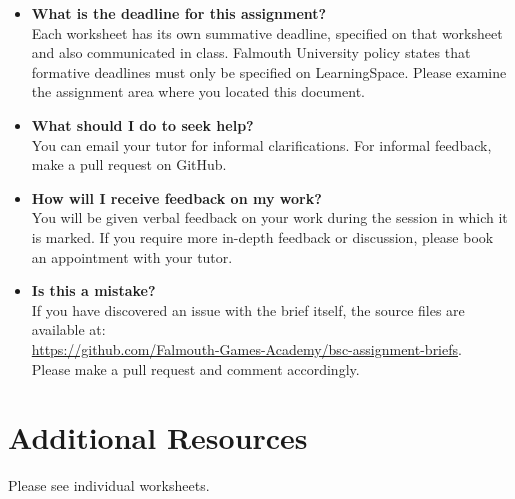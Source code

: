 \documentclass{../fal_assignment}
\begin{document}
\begin{itemize}
	\item 	\textbf{What is the deadline for this assignment?} \\ 
			Each worksheet has its own summative deadline, specified on that worksheet and also communicated in class.
    		Falmouth University policy states that formative deadlines must only be specified on LearningSpace. Please examine the assignment area where you located this document.
    		
	\item 	\textbf{What should I do to seek help?} \\ 
    		You can email your tutor for informal clarifications. For informal feedback, make a pull request on GitHub. 
    		
	\item 	\textbf{How will I receive feedback on my work?} \\ 
    		You will be given verbal feedback on your work during the session in which it is marked.
    		If you require more in-depth feedback or discussion, please book an appointment with your tutor.
    		
    	\item 	\textbf{Is this a mistake?} \\ 	
    		If you have discovered an issue with the brief itself, the source files are available at: \\
    		\url{https://github.com/Falmouth-Games-Academy/bsc-assignment-briefs}.\\
    		 Please make a pull request and comment accordingly.
\end{itemize}

\section*{Additional Resources}

Please see individual worksheets.

\end{document}
